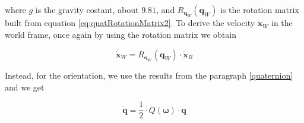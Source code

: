 \noindent  where $g$ is the gravity costant, about $9.81$, and $R_{\mathbf{q}_W}(\mathbf{q}_W)$ is the rotation matrix built from equation \eqref{eq:quatRotationMatrix2}. To derive the velocity $\dot{\mathbf{x}}_W$ in the world frame, once again by using the rotation matrix we obtain

\begin{equation}
	\dot{\mathbf{x}}_W = R_{\mathbf{q}_W}(\mathbf{q}_W)\cdot\dot{\mathbf{x}}_B
	\label{eq:velocityWorld}
\end{equation}

\noindent Instead, for the orientation, we use the results from the paragraph \ref{quaternion} and we get

\begin{equation}
	\dot{\mathbf{q}} = \frac{1}{2}\cdot Q(\boldsymbol{\omega})\cdot\mathbf{q}
	\label{eq:orientation}
\end{equation}


